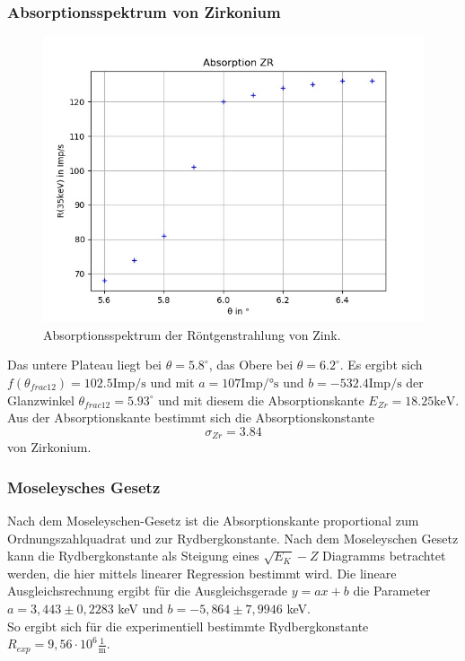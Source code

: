 \subsubsection*{Absorptionsspektrum von Zirkonium}
\begin{figure}[H]
  \centering
  \includegraphics{content/Zr.png}
  \caption{Absorptionsspektrum der Röntgenstrahlung von Zink.}
  \label{fig:zr}
\end{figure}
Das untere Plateau liegt bei $\theta=5.8^\circ$, das Obere bei $\theta=6.2^\circ$. Es ergibt sich $f(\theta_{frac{1}{2}})=102.5 \textrm{Imp/s}$ und mit $a=107 \textrm{Imp/°s}$ und $b=-532.4 \textrm{Imp/s}$ der Glanzwinkel $\theta_{frac{1}{2}}=5.93^\circ$ und mit diesem die Absorptionskante $E_{Zr}=18.25 \textrm{keV}$. Aus der Absorptionskante bestimmt sich die Absorptionskonstante
\begin{equation*}
  \sigma_{Zr}=3.84
\end{equation*}
von Zirkonium.




\subsubsection*{Moseleysches Gesetz}
Nach dem Moseleyschen-Gesetz ist die Absorptionskante proportional zum Ordnungszahlquadrat und zur Rydbergkonstante. Nach dem Moseleyschen Gesetz kann die Rydbergkonstante als Steigung eines $\sqrt{E_{K}}-Z$ Diagramms betrachtet werden, die hier mittels linearer Regression bestimmt wird. 
Die lineare Ausgleichsrechnung ergibt für die Ausgleichsgerade $y = ax + b$ die Parameter $a = 3,443 \pm 0,2283$ keV und $b = -5,864 \pm 7,9946$ keV.\\
So ergibt sich für die experimentiell bestimmte Rydbergkonstante $R_{exp} = 9,56 \cdot 10^6 \mathrm{\frac{1}{m}}$. 

